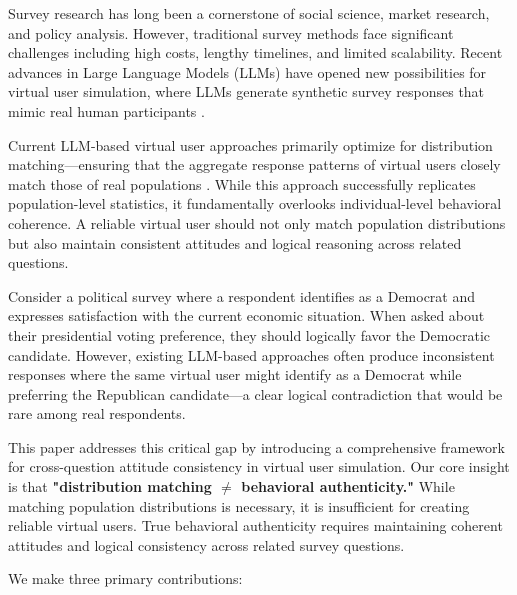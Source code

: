 \documentclass[sigconf, anonymous]{acmart}
\begin{document}
Survey research has long been a cornerstone of social science, market research, and policy analysis. However, traditional survey methods face significant challenges including high costs, lengthy timelines, and limited scalability. Recent advances in Large Language Models (LLMs) have opened new possibilities for virtual user simulation, where LLMs generate synthetic survey responses that mimic real human participants \cite{park2023generative, chen2025polypersona, wang2025large}.

Current LLM-based virtual user approaches primarily optimize for distribution matching—ensuring that the aggregate response patterns of virtual users closely match those of real populations \cite{zhang2025llm, liu2025alignsurvey}. While this approach successfully replicates population-level statistics, it fundamentally overlooks individual-level behavioral coherence. A reliable virtual user should not only match population distributions but also maintain consistent attitudes and logical reasoning across related questions.

Consider a political survey where a respondent identifies as a Democrat and expresses satisfaction with the current economic situation. When asked about their presidential voting preference, they should logically favor the Democratic candidate. However, existing LLM-based approaches often produce inconsistent responses where the same virtual user might identify as a Democrat while preferring the Republican candidate—a clear logical contradiction that would be rare among real respondents.

This paper addresses this critical gap by introducing a comprehensive framework for cross-question attitude consistency in virtual user simulation. Our core insight is that \textbf{"distribution matching $\neq$ behavioral authenticity."} While matching population distributions is necessary, it is insufficient for creating reliable virtual users. True behavioral authenticity requires maintaining coherent attitudes and logical consistency across related survey questions.

We make three primary contributions:
\end{document}
